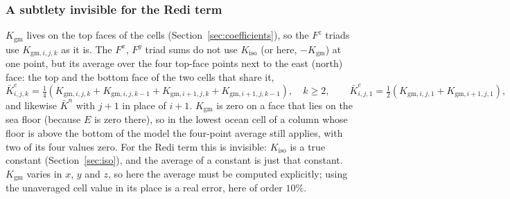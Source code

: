\documentclass{article}
\begin{document}
\subsubsection*{A subtlety invisible for the Redi term}
$K_\text{gm}$ lives on the top faces of the cells (Section~\ref{sec:coefficients}), so the $F^z$ triads use $K_{\text{gm},i,j,k}$ as it is.
The $F^x$, $F^y$ triad sums do not use $K_\text{iso}$ (or here, $-K_\text{gm}$) at one point, but its average over the four top-face points next to the east (north) face: the top and the bottom face of the two cells that share it,
\[
\bar K^e_{i,j,k} = \tfrac14\left( K_{\text{gm},i,j,k} + K_{\text{gm},i,j,k-1} + K_{\text{gm},i+1,j,k} + K_{\text{gm},i+1,j,k-1} \right), \quad k \ge 2,
\qquad
\bar K^e_{i,j,1} = \tfrac12\left( K_{\text{gm},i,j,1} + K_{\text{gm},i+1,j,1} \right),
\]
and likewise $\bar K^n$ with $j+1$ in place of $i+1$.
$K_\text{gm}$ is zero on a face that lies on the sea floor (because $E$ is zero there), so in the lowest ocean cell of a column whose floor is above the bottom of the model the four-point average still applies, with two of its four values zero.
For the Redi term this is invisible: $K_\text{iso}$ is a true constant (Section~\ref{sec:iso}), and the average of a constant is just that constant. $K_\text{gm}$ varies in $x$, $y$ and $z$, so here the average must be computed explicitly; using the unaveraged cell value in its place is a real error, here of order $10\%$.
\end{document}
